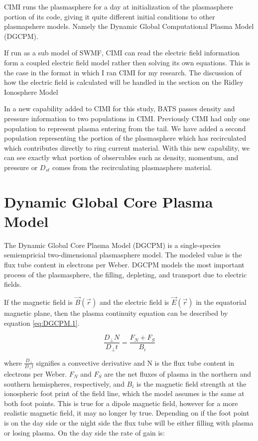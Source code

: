 \documentclass[utf8]{report}
\begin{document}
CIMI runs the plasmasphere for a day at initialization of the plasmasphere portion of its code, giving it quite different initial conditions to other plasmapshere models. Namely the Dynamic Global Computational Plasma Model (DGCPM).

If run as a sub model of SWMF, CIMI can read the electric field information form a coupled electric field model rather then solving its own equations. This is the case in the format in which I ran CIMI for my research. The discussion of how the electric field is calculated will be handled in the section on the Ridley Ionosphere Model

In a new capability added to CIMI for this study, BATS passes density and pressure information to two populations in CIMI. Previously CIMI had only one population to represent plasma entering from the tail. We have added a second population representing the portion of the plasmasphere which has recirculated which contributes directly to ring current material. With this new capability, we can see exactly what portion of observables such as density, momentum, and pressure or $D_{st}$ comes from the recirculating plasmasphere material.

\section{Dynamic Global Core Plasma Model}

The Dynamic Global Core Plasma Model (DGCPM) is a single-species semiempricial two-dimensional plasmasphere model. The modeled value is the flux tube content in electrons per Weber. DGCPM models the most important process of the plasmasphere, the filling, depleting, and transport due to electric fields.

If the magnetic field is $\vec{B}(\vec{r})$ and the electric field is $\vec{E}(\vec{r})$ in the equatorial magnetic plane, then the plasma continuity equation can be described by equation \ref{eq:DGCPM.1}.

\begin{equation}
    \frac{D_{\bot}N}{D_{\bot}t} = \frac{F_{N} + F_{S}}{B_{i}}
    \label{eq:DGCPM.1}
\end{equation}

where $\frac{D_{\bot}}{D_{\bot}t}$ signifies a convective derivative and N is the flux tube content in electrons per Weber. $F_{N}$ and $F_{S}$ are the net fluxes of plasma in the northern and southern hemispheres, respectively, and $B_{i}$ is the magnetic field strength at the ionospheric foot print of the field line, which the model assumes is the same at both foot points. This is true for a dipole magnetic field, however for a more realistic magnetic field, it may no longer by true. Depending on if the foot point is on the day side or the night side the flux tube will be either filling with plasma or losing plasma. On the day side the rate of gain is: 
\end{document}
